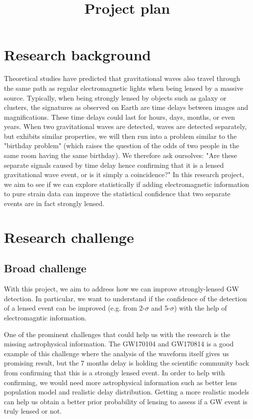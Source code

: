 \documentclass[pdflatex,sn-mathphys-num]{sn-jnl}%
\theoremstyle{thmstyleone}%
\theoremstyle{thmstyletwo}%
\theoremstyle{thmstylethree}%
\begin{document}
\title[Article Title]{Project plan}

\author{ }

\maketitle


\section{Research background}

Theoretical studies have predicted that gravitational waves also travel through the same path as regular electromagnetic lights when being lensed by a massive source. Typically, when being strongly lensed by objects such as galaxy or clusters, the signatures as observed on Earth are time delays between images and magnifications. These time delays could last for hours, days, months, or even years. When two gravitational waves are detected, waves are detected separately, but exhibits similar properties, we will then run into a problem similar to the "birthday problem" (which raises the question of the odds of two people in the same room having the same birthday). We therefore ask oursolves: "Are these separate signals caused by time delay hence confirming that it is a lensed gravitational wave event, or is it simply a coincidence?" In this research project, we aim to see if we can explore statistically if adding electromagnetic information to pure strain data can improve the statistical confidence that two separate events are in fact strongly lensed. 

\section{Research challenge}

\subsection{Broad challenge}

With this project, we aim to address how we can improve strongly-lensed GW detection. In particular, we want to understand if the confidence of the detection of a lensed event can be improved (e.g. from 2-$\sigma$ and 5-$\sigma$) with the help of electromagntic information.

One of the prominent challenges that could help us with the research is the missing astrophysical information. The GW170104 and GW170814 is a good example of this challenge where the analysis of the waveform itself gives us promising result, but the 7 months delay is holding the scientific community back from confirming that this is a strongly lensed event. In order to help with confirming, we would need more astrophysical information such as better lens population model and realistic delay distribution. Getting a more realistic models can help us obtain a better prior probability of lensing to assess if a GW event is truly lensed or not.
\end{document}

